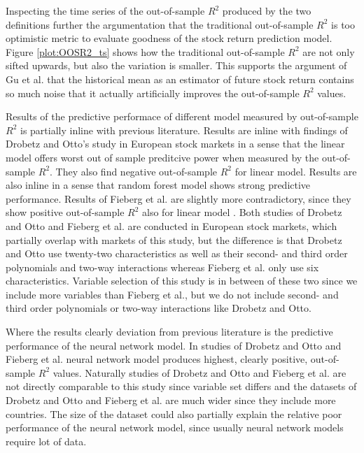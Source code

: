 \documentclass{article}
\begin{document}
Inspecting the time series of the out-of-sample $R^2$ produced by the two definitions further the argumentation that the traditional out-of-sample $R^2$ is too optimistic metric to evaluate goodness of the stock return prediction model. Figure \ref{plot:OOSR2_ts} shows how the traditional out-of-sample $R^2$ are not only sifted upwards, but also the variation is smaller. This supports the argument of Gu et al. \citeyear{guetal} that the historical mean as an estimator of future stock return contains so much noise that it actually artificially improves the out-of-sample $R^2$ values. \par

Results of the predictive performace of different model measured by out-of-sample $R^2$ is partially inline with previous literature. Results are inline with findings of Drobetz and Otto's \citeyear{Drobetz} study in European stock markets in a sense that the linear model offers worst out of sample preditcive power when measured by the out-of-sample $R^2$. They also find negative out-of-sample $R^2$ for linear model. Results are also inline in a sense that random forest model shows strong predictive performance. Results of Fieberg et al. \citeyear{Fieberg} are slightly more contradictory, since they show positive out-of-sample $R^2$ also for linear model \footnotemark. Both studies of Drobetz and Otto and Fieberg et al. are conducted in European stock markets, which partially overlap with markets of this study, but the difference is that Drobetz and Otto use twenty-two characteristics as well as their  second- and third order polynomials and two-way interactions whereas Fieberg et al. only use six characteristics. Variable selection of this study is in between of these two since we include more variables than Fieberg et al., but we do not include second- and third order polynomials or two-way interactions like Drobetz and Otto. \par


Where the results clearly deviation from previous literature is the predictive performance of the neural network model. In studies of Drobetz and Otto \citeyear{Drobetz} and Fieberg et al. \citeyear{Fieberg} neural network model produces highest, clearly positive, out-of-sample $R^2$ values. Naturally studies of Drobetz and Otto and Fieberg et al. are not directly comparable to this study since variable set differs and the datasets of  Drobetz and Otto and Fieberg et al. are much wider since they include more countries. The size of the dataset could also partially explain the relative poor performance of the neural network model, since usually neural network models require lot of data. \par
\end{document}
